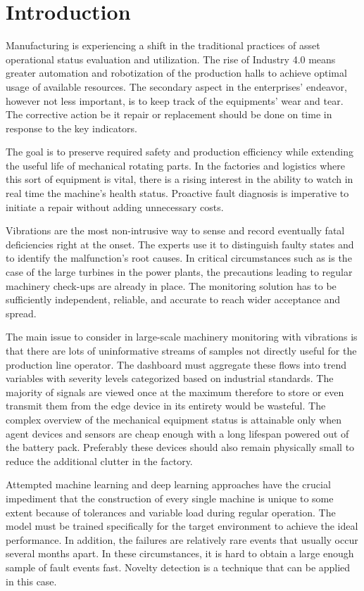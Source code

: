 \chapter{Introduction}
Manufacturing is experiencing a shift in the traditional practices of asset operational status evaluation and utilization. The rise of Industry 4.0 means greater automation and robotization of the production halls to achieve optimal usage of available resources. The secondary aspect in the enterprises' endeavor, however not less important, is to keep track of the equipments' wear and tear. The corrective action be it repair or replacement should be done on time in response to the key indicators.

The goal is to preserve required safety and production efficiency while extending the useful life of mechanical rotating parts. In the factories and logistics where this sort of equipment is vital, there is a rising interest in the ability to watch in real time the machine's health status. Proactive fault diagnosis is imperative to initiate a repair without adding unnecessary costs.

Vibrations are the most non-intrusive way to sense and record eventually fatal deficiencies right at the onset. The experts use it to distinguish faulty states and to identify the malfunction's root causes. In critical circumstances such as is the case of the large turbines in the power plants, the precautions leading to regular machinery check-ups are already in place. The monitoring solution has to be sufficiently independent, reliable, and accurate to reach wider acceptance and spread.

The main issue to consider in large-scale machinery monitoring with vibrations is that there are lots of uninformative streams of samples not directly useful for the production line operator. The dashboard must aggregate these flows into trend variables with severity levels categorized based on industrial standards. The majority of signals are viewed once at the maximum therefore to store or even transmit them from the edge device in its entirety would be wasteful. The complex overview of the mechanical equipment status is attainable only when agent devices and sensors are cheap enough with a long lifespan powered out of the battery pack. Preferably these devices should also remain physically small to reduce the additional clutter in the factory.

Attempted machine learning and deep learning approaches have the crucial impediment that the construction of every single machine is unique to some extent because of tolerances and variable load during regular operation. The model must be trained specifically for the target environment to achieve the ideal performance. In addition, the failures are relatively rare events that usually occur several months apart. In these circumstances, it is hard to obtain a large enough sample of fault events fast. Novelty detection is a technique that can be applied in this case.

